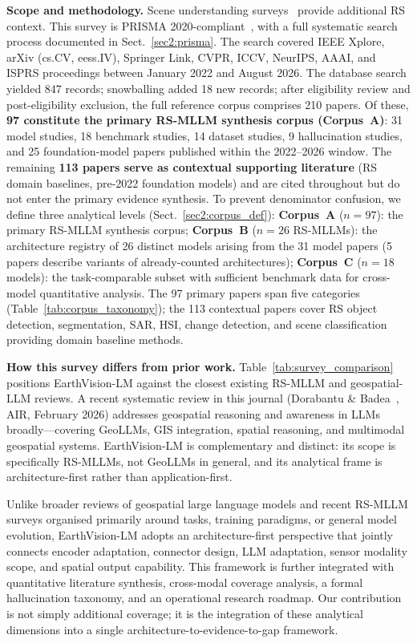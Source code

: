 \textbf{Scope and methodology.}
Scene understanding surveys~\cite{earthvision2024,hrben2022} provide additional RS context. This survey is PRISMA 2020-compliant~\cite{prisma2020}, with a full systematic
search process documented in Sect.~\ref{sec2:prisma}. The search covered IEEE
Xplore, arXiv (cs.CV, eess.IV), Springer Link, CVPR, ICCV, NeurIPS, AAAI, and
ISPRS proceedings between January 2022 and August 2026. The database search
yielded 847 records; snowballing added 18 new records; after eligibility review
and post-eligibility exclusion, the full reference corpus comprises 210 papers.
Of these, \textbf{97 constitute the primary RS-MLLM synthesis corpus
(Corpus~A)}: 31 model studies, 18 benchmark studies, 14 dataset studies,
9 hallucination studies, and 25 foundation-model papers published within
the 2022--2026 window. The remaining \textbf{113 papers serve as contextual
supporting literature} (RS domain baselines, pre-2022 foundation models)
and are cited throughout but do not enter the primary evidence synthesis.
To prevent denominator confusion, we define three analytical levels (Sect.~\ref{sec2:corpus_def}):
\textbf{Corpus~A} ($n=97$): the primary RS-MLLM synthesis corpus;
\textbf{Corpus~B} ($n=26$ RS-MLLMs): the architecture registry of 26 distinct
models arising from the 31 model papers (5 papers describe variants of
already-counted architectures); \textbf{Corpus~C} ($n=18$ models): the
task-comparable subset with sufficient benchmark data for cross-model
quantitative analysis.
The 97 primary papers span five categories (Table~\ref{tab:corpus_taxonomy});
the 113 contextual papers cover RS object detection, segmentation, SAR, HSI,
change detection, and scene classification providing domain baseline methods.

\textbf{How this survey differs from prior work.}
Table~\ref{tab:survey_comparison} positions EarthVision-LM against the closest existing
RS-MLLM and geospatial-LLM reviews. A recent systematic review in this journal
(Dorabantu \& Badea~\cite{dorabantu2026geollm}, AIR, February 2026) addresses geospatial
reasoning and awareness in LLMs broadly---covering GeoLLMs, GIS integration, spatial
reasoning, and multimodal geospatial systems. EarthVision-LM is complementary and distinct:
its scope is specifically RS-MLLMs, not GeoLLMs in general, and its analytical frame
is architecture-first rather than application-first.

Unlike broader reviews of geospatial large language models and recent RS-MLLM surveys
organised primarily around tasks, training paradigms, or general model evolution,
EarthVision-LM adopts an architecture-first perspective that jointly connects encoder
adaptation, connector design, LLM adaptation, sensor modality scope, and spatial output
capability. This framework is further integrated with quantitative literature synthesis,
cross-modal coverage analysis, a formal hallucination taxonomy, and an operational
research roadmap. Our contribution is not simply additional coverage; it is the
integration of these analytical dimensions into a single
architecture-to-evidence-to-gap framework.

